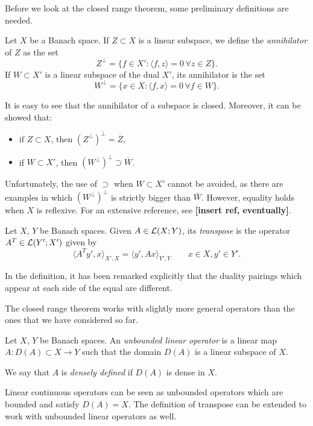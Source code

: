 Before we look at the closed range theorem, some preliminary definitions are needed.
\begin{definition}
	Let $X$ be a Banach space. If $Z \subset X$ is a linear subspace, we define the \emph{annihilator} of $Z$ as the set
	\[
	Z^\perp = \{f \in X' : \langle f, z \rangle = 0 \, \forall z \in Z\}.
	\]
	If $W \subset X'$ is a linear subspace of the dual $X'$, its annihilator is the set
	\[
	W^\perp = \{x \in X : \langle f, x \rangle = 0 \, \forall f \in W\}.
	\]
\end{definition}
It is easy to see that the annihilator of a subspace is closed. Moreover, it can be showed that:
\begin{itemize}
	\item if $Z \subset X$, then $(Z^\perp)^\perp = \overline{Z}$,
	\item if $W \subset X'$, then $(W^\perp)^\perp \supset \overline{W}$.
\end{itemize}
Unfortunately, the use of $\supset$ when $W \subset X'$ cannot be avoided, as there are examples in which $(W^\perp)^\perp$ is strictly bigger than $\overline{W}$. However, equality holds when $X$ is reflexive. For an extensive reference, see \textbf{[insert ref, eventually]}.

\begin{definition}
	Let $X$, $Y$ be Banach spaces. Given $A \in \mathcal{L}(X;Y)$, its \emph{transpose} is the operator $A^T \in \mathcal{L}(Y';X')$ given by
	\[
	\langle A^T y', x \rangle_{X',X} = \langle y', Ax \rangle_{Y',Y} \qquad x \in X, y' \in Y'.
	\]
\end{definition}
In the definition, it has been remarked explicitly that the duality pairings which appear at each side of the equal are different.

The closed range theorem works with slightly more general operators than the ones that we have considered so far.
\begin{definition}
	Let $X$, $Y$ be Banach spaces. An \emph{unbounded linear operator} is a linear map $A: D(A) \subset X \to Y$ such that the domain $D(A)$ is a linear subspace of $X$.
	
	We say that $A$ is \emph{densely defined} if $D(A)$ is dense in $X$.
\end{definition}
Linear continuous operators can be seen as unbounded operators which are bounded and satisfy $D(A) = X$.
The definition of transpose can be extended to work with unbounded linear operators as well.

